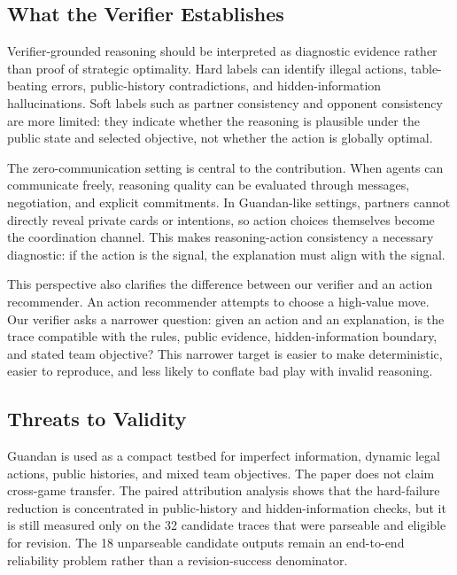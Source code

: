 \documentclass[sigconf,anonymous,review]{acmart}
\begin{document}
\subsection{What the Verifier Establishes}

Verifier-grounded reasoning should be interpreted as diagnostic evidence rather than proof of strategic optimality. Hard labels can identify illegal actions, table-beating errors, public-history contradictions, and hidden-information hallucinations. Soft labels such as partner consistency and opponent consistency are more limited: they indicate whether the reasoning is plausible under the public state and selected objective, not whether the action is globally optimal.

The zero-communication setting is central to the contribution. When agents can communicate freely, reasoning quality can be evaluated through messages, negotiation, and explicit commitments. In Guandan-like settings, partners cannot directly reveal private cards or intentions, so action choices themselves become the coordination channel. This makes reasoning-action consistency a necessary diagnostic: if the action is the signal, the explanation must align with the signal.

This perspective also clarifies the difference between our verifier and an action recommender. An action recommender attempts to choose a high-value move. Our verifier asks a narrower question: given an action and an explanation, is the trace compatible with the rules, public evidence, hidden-information boundary, and stated team objective? This narrower target is easier to make deterministic, easier to reproduce, and less likely to conflate bad play with invalid reasoning.

\subsection{Threats to Validity}

Guandan is used as a compact testbed for imperfect information, dynamic legal actions, public histories, and mixed team objectives. The paper does not claim cross-game transfer. The paired attribution analysis shows that the hard-failure reduction is concentrated in public-history and hidden-information checks, but it is still measured only on the 32 candidate traces that were parseable and eligible for revision. The 18 unparseable candidate outputs remain an end-to-end reliability problem rather than a revision-success denominator.
\end{document}
